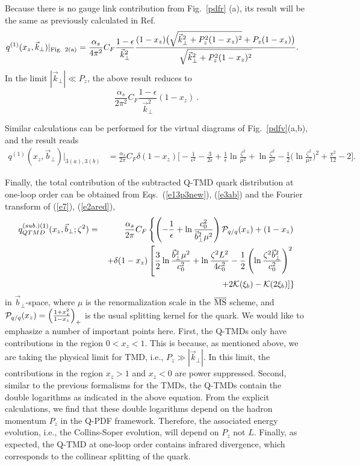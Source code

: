 \documentclass[aps,prd,preprint,tightenlines,superscriptaddress,nofootinbib]{revtex4}
\begin{document}
Because there is no gauge link contribution from Fig.~\ref{pdfr} (a), its result 
will be the same as previously calculated in Ref.~\cite{Ji:2014hxa}
\begin{align}
q^{(1)}(x_z,{\vec k}_\perp)|_{\rm Fig.~2(a)}&=\frac{\alpha_s}{4\pi^2}C_F\frac{1-\epsilon}{{\vec k}_\perp^2}\frac{(1-x_z)\big(\sqrt{{\vec k}_\perp^2+P_z^2(1-x_z)^2}+P_z(1-x_z)\big)}{\sqrt{{\vec k}_\perp^2+P_z^2(1-x_z)^2}}.
\end{align}
 In the limit $|{\vec k}_\perp|\ll P_z$, the above result reduces to
\begin{equation}\label{e2ared}
\frac{\alpha_s}{2\pi^2}C_F\frac{1-\epsilon}{{\vec k}_\perp^2}(1-x_z)\ .
\end{equation}

Similar calculations can be
performed for the virtual diagrams of Fig.~\ref{pdfv}(a,b), and the result reads~\cite{Ji:2014hxa}
\begin{align}\label{e3ab}
q^{(1)}(x_z,{\vec b}_\perp)|_{3(a), 3(b)}&=\frac{\alpha_s}{2\pi}C_F\delta(1-x_z)\Big[-\frac{1}{\epsilon^2}-\frac{3}{2\epsilon}+\frac{1}{\epsilon}\ln\frac{\zeta^2}{\mu^2}+\ln\frac{\zeta^2}{\mu^2}-\frac{1}{2}\Big(\ln\frac{\zeta^2}{\mu^2}\Big)^2+\frac{\pi^2}{12}-2\Big].
\end{align}


Finally, the total contribution of the subtracted
Q-TMD quark distribution at one-loop order can be obtained from Eqs.~(\ref{e13p3new}), (\ref{e3ab}) and the Fourier transform of (\ref{e7}), (\ref{e2ared}),
\begin{eqnarray}
{q}_{QTMD}^{(sub.)(1)}(x_z,{\vec b}_\perp;\zeta^2)&=&\frac{\alpha_s}{2\pi}C_F\left\{\left(-\frac{1}{\epsilon}
+\ln\frac{c_0^2}{{\vec b}_\perp^2\mu^2}\right){\cal P}_{q/q}(x_z)+(1-x_z)\right.\nonumber\\
&&\left.+\delta(1-x_z)\left[\frac{3}{2}\ln\frac{{\vec b}_\perp^2\mu^2}{c_0^2}+\ln\frac{\zeta^2L^2}{4c_0^2}
-\frac{1}{2}\left(\ln\frac{\zeta^2{\vec b}_\perp^2}{c_0^2}\right)^2\right.\right.\nonumber\\
&&\left.\left.+2{\cal K}(\xi_b)-{\cal K}(2\xi_b)\right]\right\}  \label{oneloop}
\end{eqnarray}
in ${\vec b}_\perp$-space, where
$\mu$ is the renormalization scale in the $\overline{\rm MS}$ scheme,
and ${\cal P}_{q/q}(x_z)=\left(\frac{1+x_z^2}{1-x_z}\right)_+$ is the usual splitting kernel for the quark. 
We would like to emphasize a number of important points here. First, the Q-TMDs
only have contributions in the region $0<x_z<1$. This is because, as mentioned
above, we are taking the physical limit for TMD, i.e., $P_z\gg |{\vec k}_\perp|$. In this limit, the
contributions in the region $x_z>1$ and $x_z<0$ are power suppressed.
Second, similar to the previous formalisms for the TMDs, the Q-TMDs contain
the double logarithms as indicated in the above equation. From the explicit
calculations, we find that these double logarithms depend on the hadron
momentum $P_z$ in the Q-PDF framework. Therefore, the 
associated energy evolution, i.e., the Collins-Soper
evolution, will depend on $P_z$ not $L$. Finally, as expected,
the Q-TMD at one-loop order contains infrared divergence,
which corresponds to the collinear splitting of the quark.  
\end{document}

